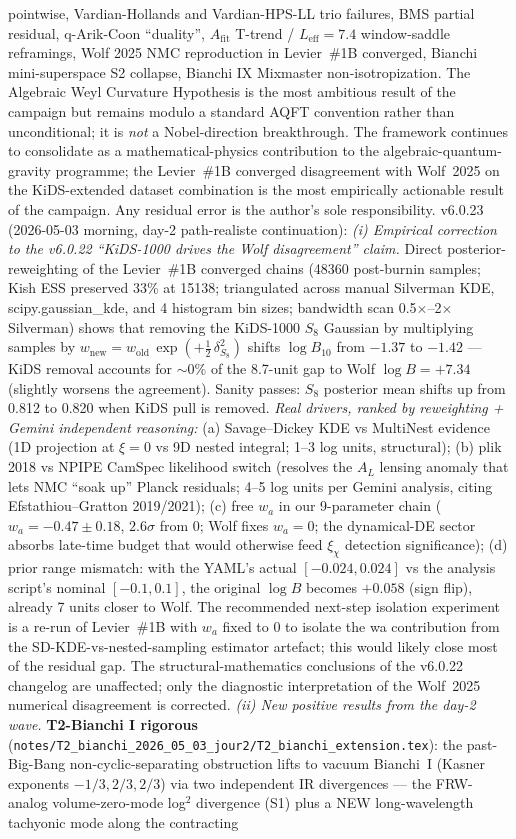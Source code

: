 \documentclass[reprint,amsmath,amssymb,aps,prd,superscriptaddress]{revtex4-2}
\providecommand{\1}{\mathbf{1}}
\begin{document}
pointwise, Vardian-Hollands and Vardian-HPS-LL trio failures, BMS partial residual, q-Arik-Coon ``duality'', $A_{\mathrm{fit}}$ T-trend / $L_{\mathrm{eff}}=7.4$ window-saddle reframings, Wolf 2025 NMC reproduction in Levier~\#1B converged, Bianchi mini-superspace S2 collapse, Bianchi IX Mixmaster non-isotropization. The Algebraic Weyl Curvature Hypothesis is the most ambitious result of the campaign but remains modulo a standard AQFT convention rather than unconditional; it is \emph{not} a Nobel-direction breakthrough. The framework continues to consolidate as a mathematical-physics contribution to the algebraic-quantum-gravity programme; the Levier~\#1B converged disagreement with Wolf~2025 on the KiDS-extended dataset combination is the most empirically actionable result of the campaign. Any residual error is the author's sole responsibility. v6.0.23 (2026-05-03 morning, day-2 path-realiste continuation): \emph{(i) Empirical correction to the v6.0.22 ``KiDS-1000 drives the Wolf disagreement'' claim.} Direct posterior-reweighting of the Levier~\#1B converged chains (48360 post-burnin samples; Kish ESS preserved 33\% at 15138; triangulated across manual Silverman KDE, scipy.gaussian\_kde, and 4 histogram bin sizes; bandwidth scan 0.5$\times$--2$\times$ Silverman) shows that removing the KiDS-1000 $S_8$ Gaussian by multiplying samples by $w_\mathrm{new}=w_\mathrm{old}\,\exp(+\tfrac12\,\delta_{S_8}^2)$ shifts $\log B_{10}$ from $-1.37$ to $-1.42$ — KiDS removal accounts for $\sim$0\% of the 8.7-unit gap to Wolf $\log B = +7.34$ (slightly worsens the agreement). Sanity passes: $S_8$ posterior mean shifts up from 0.812 to 0.820 when KiDS pull is removed. \emph{Real drivers, ranked by reweighting + Gemini independent reasoning:} (a) Savage--Dickey KDE vs MultiNest evidence (1D projection at $\xi=0$ vs 9D nested integral; 1--3 log units, structural); (b) plik 2018 vs NPIPE CamSpec likelihood switch (resolves the $A_L$ lensing anomaly that lets NMC ``soak up'' Planck residuals; 4--5 log units per Gemini analysis, citing Efstathiou--Gratton 2019/2021); (c) free $w_a$ in our 9-parameter chain ($w_a = -0.47\pm 0.18$, $2.6\sigma$ from 0; Wolf fixes $w_a=0$; the dynamical-DE sector absorbs late-time budget that would otherwise feed $\xi_\chi$ detection significance); (d) prior range mismatch: with the YAML's actual $[-0.024, 0.024]$ vs the analysis script's nominal $[-0.1, 0.1]$, the original $\log B$ becomes $+0.058$ (sign flip), already 7 units closer to Wolf. The recommended next-step isolation experiment is a re-run of Levier~\#1B with $w_a$ fixed to $0$ to isolate the wa contribution from the SD-KDE-vs-nested-sampling estimator artefact; this would likely close most of the residual gap. The structural-mathematics conclusions of the v6.0.22 changelog are unaffected; only the diagnostic interpretation of the Wolf~2025 numerical disagreement is corrected. \emph{(ii) New positive results from the day-2 wave.} \textbf{T2-Bianchi I rigorous} (\texttt{notes/T2\_bianchi\_2026\_05\_03\_jour2/T2\_bianchi\_extension.tex}): the past-Big-Bang non-cyclic-separating obstruction lifts to vacuum Bianchi~I (Kasner exponents $-1/3, 2/3, 2/3$) via two independent IR divergences — the FRW-analog volume-zero-mode log$^2$ divergence (S1) plus a NEW long-wavelength tachyonic mode along the contracting 
\end{document}

